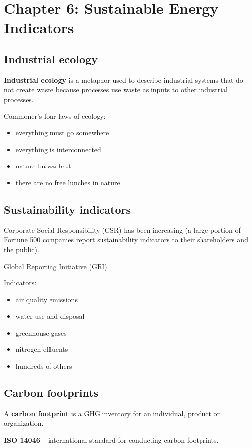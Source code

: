 \section{Chapter 6: Sustainable Energy Indicators}

\subsection{Industrial ecology}

\textbf{Industrial ecology} is a metaphor used to describe industrial systems
that do not create waste because processes use waste as inputs to other
industrial processes.

Commoner's four laws of ecology:
\begin{itemize}
	\item everything must go somewhere
	\item everything is interconnected
	\item nature knows best
	\item there are no free lunches in nature
\end{itemize}

\subsection{Sustainability indicators}

Corporate Social Responsibility (CSR) has been increasing (a large portion of
Fortune 500 companies report sustainability indicators to their shareholders
and the public).

Global Reporting Initiative (GRI)

Indicators:
\begin{itemize}
	\item air quality emissions
	\item water use and disposal
	\item greenhouse gases
	\item nitrogen effluents
	\item hundreds of others
\end{itemize}

\subsection{Carbon footprints}

A \textbf{carbon footprint} is a GHG inventory for an individual, product or
organization.

\textbf{ISO 14046} -- international standard for conducting carbon footprints.

